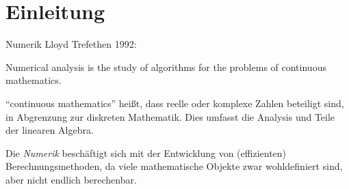 \section{Einleitung}

\begin{defi}{Numerik}
    Lloyd Trefethen 1992:
    \begin{displayquote}
        Numerical analysis is the study of algorithms for the problems of continuous mathematics.
    \end{displayquote}

    \enquote{continuous mathematics} heißt, dass reelle oder komplexe Zahlen beteiligt sind, in Abgrenzung zur diskreten Mathematik.
    Dies umfasst die Analysis und Teile der linearen Algebra.

    Die \emph{Numerik} beschäftigt sich mit der Entwicklung von (effizienten) Berechnungsmethoden, da viele mathematische Objekte zwar wohldefiniert sind, aber nicht endlich berechenbar.
\end{defi}

